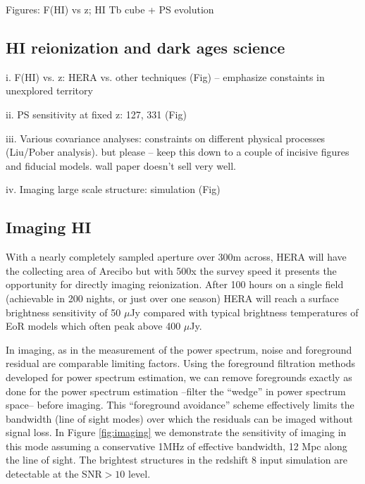 \documentclass[preprint]{aastex}
\begin{document}
Figures: F(HI) vs z;  HI Tb cube + PS evolution


\subsection{HI reionization and dark ages science} %

i. F(HI) vs. z: HERA vs. other techniques (Fig) -- emphasize constaints in unexplored territory

ii. PS sensitivity at fixed z: 127, 331 (Fig)

iii. Various covariance analyses: constraints on different physical processes (Liu/Pober analysis). but
please -- keep this down to a couple of incisive figures and fiducial models. wall paper doesn't sell very well. 

iv. Imaging large scale structure: simulation (Fig) 
\subsection{Imaging HI}
With a nearly completely sampled aperture over 300m across, HERA will have the collecting area of Arecibo but with 500x the survey speed it presents the opportunity for directly imaging reionization.  After 100 hours on a single field (achievable in 200 nights, or just over one season) HERA will reach a surface brightness sensitivity of 50 $\mu$Jy compared with typical brightness temperatures of EoR models which often peak above 400 $\mu$Jy.

In imaging, as in the measurement of the power spectrum, noise and foreground residual are comparable limiting factors. Using the foreground filtration methods developed for power spectrum estimation, we can remove foregrounds exactly as done for the power spectrum estimation --filter the ``wedge'' in power spectrum space-- before imaging.  This ``foreground avoidance'' scheme effectively limits the bandwidth (line of sight modes) over which the residuals can be imaged without signal loss.  In Figure \ref{fig:imaging} we demonstrate the sensitivity of imaging in this mode assuming a conservative 1MHz of effective bandwidth, 12 Mpc along the line of sight.  The brightest structures in the redshift 8 input simulation are detectable at the SNR$>10$ level.
\end{document}
